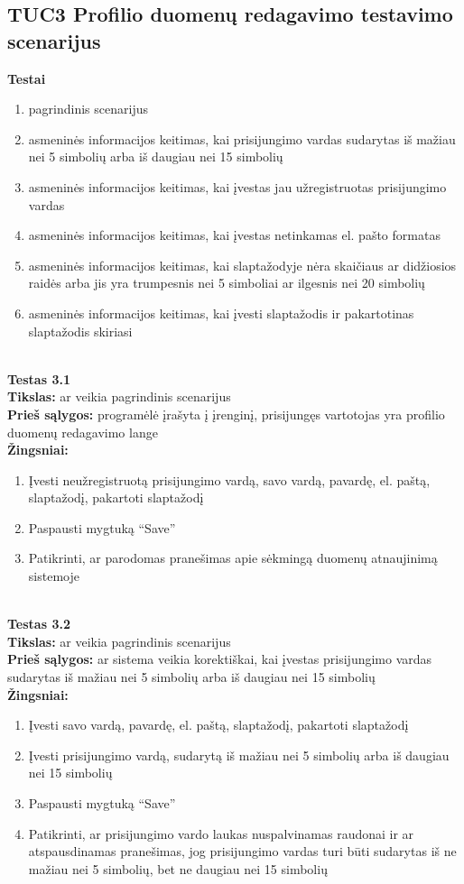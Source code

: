 \documentclass{VUMIFPSkursinis}
\begin{document}
	\subsection{TUC3 Profilio duomenų redagavimo testavimo scenarijus}
		\textbf{Testai}
		\begin{enumerate}[noitemsep,topsep=0pt]
			\item pagrindinis scenarijus
			\item asmeninės informacijos keitimas, kai prisijungimo vardas sudarytas iš mažiau nei 5 simbolių arba iš daugiau nei 15 simbolių
			\item asmeninės informacijos keitimas, kai įvestas jau užregistruotas prisijungimo vardas
			\item asmeninės informacijos keitimas, kai įvestas netinkamas el. pašto formatas
			\item asmeninės informacijos keitimas, kai slaptažodyje nėra skaičiaus ar didžiosios raidės arba jis yra trumpesnis nei 5 simboliai ar ilgesnis nei 20 simbolių
			\item asmeninės informacijos keitimas, kai įvesti slaptažodis ir pakartotinas slaptažodis skiriasi
		\end{enumerate}
		\textbf{}\\
		\textbf{Testas 3.1}\\
		\textbf{Tikslas:} ar veikia pagrindinis scenarijus\\
		\textbf{Prieš sąlygos:} programėlė įrašyta į įrenginį, prisijungęs vartotojas yra profilio duomenų redagavimo lange\\
		\textbf{Žingsniai:}
		\begin{enumerate}[noitemsep,topsep=0pt]
			\item Įvesti neužregistruotą prisijungimo vardą, savo vardą, pavardę, el. paštą, slaptažodį, pakartoti slaptažodį
			\item Paspausti mygtuką “Save” 
			\item Patikrinti, ar parodomas pranešimas apie sėkmingą duomenų atnaujinimą sistemoje
		\end{enumerate}
		\textbf{}\\
		\textbf{Testas 3.2}\\
		\textbf{Tikslas:} ar veikia pagrindinis scenarijus\\
		\textbf{Prieš sąlygos:} ar sistema veikia korektiškai, kai įvestas prisijungimo vardas sudarytas iš mažiau nei 5 simbolių arba iš daugiau nei 15 simbolių\\
		\textbf{Žingsniai:}
		\begin{enumerate}[noitemsep,topsep=0pt]
			\item Įvesti savo vardą, pavardę, el. paštą, slaptažodį, pakartoti slaptažodį
			\item Įvesti prisijungimo vardą, sudarytą iš mažiau nei 5 simbolių arba iš daugiau nei 15 simbolių
			\item Paspausti mygtuką “Save” 
			\item Patikrinti, ar prisijungimo vardo laukas nuspalvinamas raudonai ir ar atspausdinamas pranešimas, jog prisijungimo vardas turi būti sudarytas iš ne mažiau nei 5 simbolių, bet ne daugiau nei 15 simbolių
		\end{enumerate}
\end{document}
